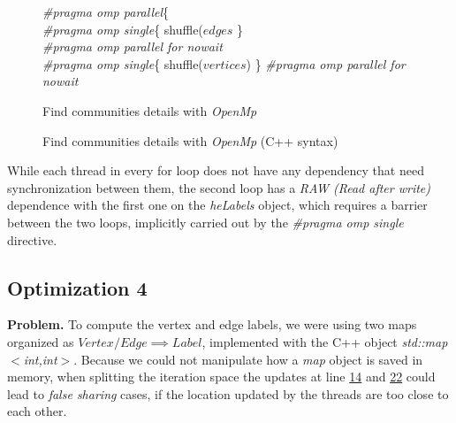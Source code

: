 \documentclass[conference]{IEEEtran}
\newcommand{\mypar}[1]{{\bf #1.}}
\begin{document}
\begin{figure}[h]
    \centering
    \begin{algorithm}[H]
    \label{alg:find_communities_3}
    \SetAlgoLined
    \LinesNumbered
        \textit{\#pragma omp parallel}\{\\
        \textit{\#pragma omp single}\{ shuffle($edges$ \}\\
        \textit{\#pragma omp parallel for nowait}\\
        \textit{\#pragma omp single}\{ shuffle($vertices$) \}\;
        \textit{\#pragma omp parallel for nowait}\\
    \caption{Find communities details with \textit{OpenMp}}
\end{algorithm}
    \caption{Find communities details with \textit{OpenMp} (C++ syntax)}
    \label{fig:my_label}
\end{figure}

While each thread in every for loop does not have any dependency that need synchronization between them, the second loop has a \textit{RAW (Read after write)} dependence with the first one on the \textit{heLabels} object, which requires a barrier between the two loops, implicitly carried out by the \textit{\#pragma omp single} directive. 

\subsection{Optimization 4}
\mypar{Problem}
To compute the vertex and edge labels, we were using two maps organized as \textit{$Vertex/Edge \implies Label$}, implemented with the C++ object \textit{std::map$<$int,int$>$}. Because we could not manipulate how a \textit{map} object is saved in memory, when splitting the iteration space the updates at line \hyperref[alg:find_communities]{14} and \hyperref[alg:find_communities]{22} could lead to \textit{false sharing} cases, if the location updated by the threads are too close to each other.
\end{document}
